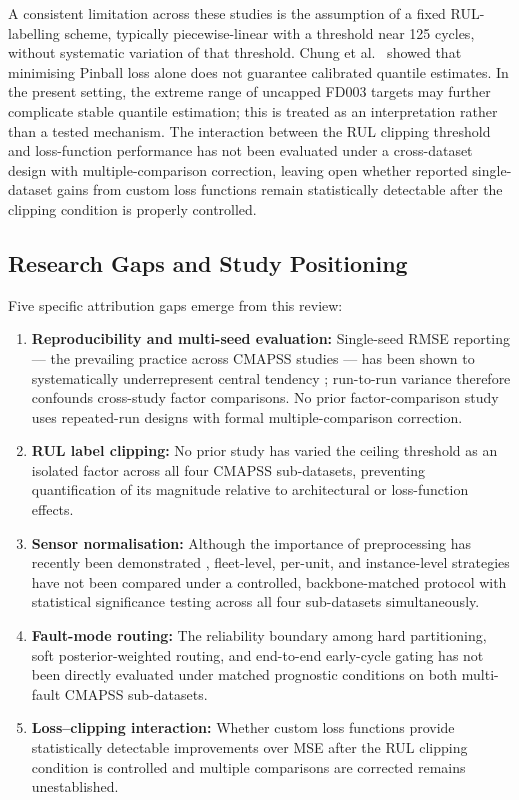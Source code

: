\documentclass[preprint,10pt]{elsarticle}
\begin{document}
A consistent limitation across these studies is the assumption of a fixed RUL-labelling scheme, typically piecewise-linear with a threshold near 125 cycles, without systematic variation of that threshold. Chung et al.\ \cite{ref41} showed that minimising Pinball loss alone does not guarantee calibrated quantile estimates. In the present setting, the extreme range of uncapped FD003 targets may further complicate stable quantile estimation; this is treated as an interpretation rather than a tested mechanism. The interaction between the RUL clipping threshold and loss-function performance has not been evaluated under a cross-dataset design with multiple-comparison correction, leaving open whether reported single-dataset gains from custom loss functions remain statistically detectable after the clipping condition is properly controlled.

\subsection{Research Gaps and Study Positioning}

Five specific attribution gaps emerge from this review:

\begin{enumerate}
\item \textbf{Reproducibility and multi-seed evaluation:} Single-seed RMSE reporting --- the prevailing practice across CMAPSS studies --- has been shown to systematically underrepresent central tendency \cite{ref51}; run-to-run variance therefore confounds cross-study factor comparisons. No prior factor-comparison study uses repeated-run designs with formal multiple-comparison correction.
\item \textbf{RUL label clipping:} No prior study has varied the ceiling threshold as an isolated factor across all four CMAPSS sub-datasets, preventing quantification of its magnitude relative to architectural or loss-function effects.
\item \textbf{Sensor normalisation:} Although the importance of preprocessing has recently been demonstrated \cite{ref52}, fleet-level, per-unit, and instance-level strategies have not been compared under a controlled, backbone-matched protocol with statistical significance testing across all four sub-datasets simultaneously.
\item \textbf{Fault-mode routing:} The reliability boundary among hard partitioning, soft posterior-weighted routing, and end-to-end early-cycle gating has not been directly evaluated under matched prognostic conditions on both multi-fault CMAPSS sub-datasets.
\item \textbf{Loss--clipping interaction:} Whether custom loss functions provide statistically detectable improvements over MSE after the RUL clipping condition is controlled and multiple comparisons are corrected remains unestablished.
\end{enumerate}
\end{document}
